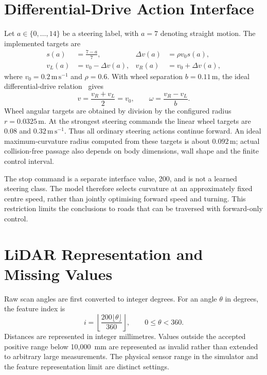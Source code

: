 \section{Differential-Drive Action Interface}
Let $a\in\{0,\ldots,14\}$ be a steering label, with $a=7$ denoting straight
motion. The implemented targets are
\begin{align}
 s(a)&=\frac{7-a}{7}, & \Delta v(a)&=\rho v_0 s(a),\\
 v_L(a)&=v_0-\Delta v(a), & v_R(a)&=v_0+\Delta v(a),
\end{align}
where $v_0=0.2\,\mathrm{m\,s^{-1}}$ and $\rho=0.6$. With wheel separation
$b=0.11\,\mathrm{m}$, the ideal differential-drive relation~\cite[Chapter~13]{lynch2017modern} gives
\begin{equation}
 v=\frac{v_R+v_L}{2}=v_0,\qquad
 \omega=\frac{v_R-v_L}{b}.
\end{equation}
Wheel angular targets are obtained by division by the configured radius
$r=0.0325\,\mathrm{m}$. At the strongest steering commands the linear wheel
targets are $0.08$ and $0.32\,\mathrm{m\,s^{-1}}$. Thus all ordinary steering
actions continue forward. An ideal maximum-curvature radius computed from
these targets is about $0.092\,\mathrm{m}$; actual collision-free passage also
depends on body dimensions, wall shape and the finite control interval.

The stop command is a separate interface value, 200, and is not a learned
steering class. The model therefore selects curvature at an approximately
fixed centre speed, rather than jointly optimising forward speed and turning.
This restriction limits the conclusions to roads that can be traversed with
forward-only control.

\section{LiDAR Representation and Missing Values}
Raw scan angles are first converted to integer degrees. For an angle $\theta$
in degrees, the feature index is
\begin{equation}
 i=\left\lfloor\frac{200\lfloor\theta\rfloor}{360}\right\rfloor,
 \qquad 0\leq\theta<360.
\end{equation}
Distances are represented in integer millimetres. Values outside the accepted
positive range below 10,000~mm are represented as invalid rather than extended
to arbitrary large measurements. The physical sensor range in the simulator
and the feature representation limit are distinct settings.

